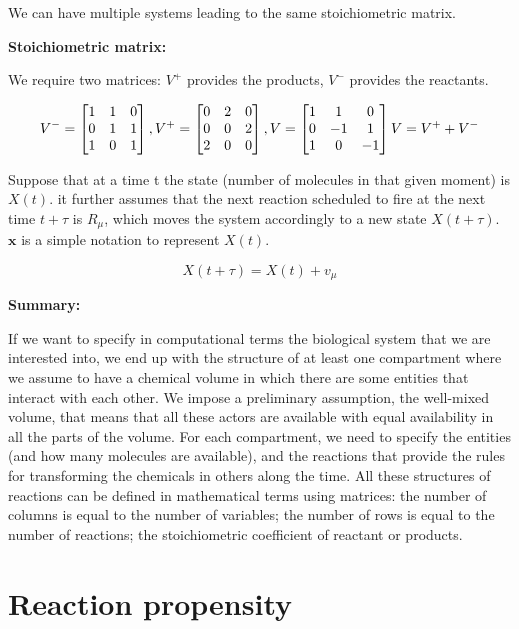 We can have multiple systems leading to the same stoichiometric matrix.

\textbf{Stoichiometric matrix:}

We require two matrices: $V^+$ provides the products, $V^-$ provides the
reactants.

$$
V^- = \begin{bmatrix} 1 & 1 & 0 \\ 0 & 1&1 \\ 1&0&1 \end{bmatrix}, V^+ = \begin{bmatrix} 0 & 2 & 0 \\ 0 & 0&2 \\ 2&0&0 \end{bmatrix} , V = \begin{bmatrix} 1 & 1 & 0 \\ 0 & -1&1 \\ 1&0&-1 \end{bmatrix} \\ V = V^+ + V^-
$$

Suppose that at a time t the state (number of molecules in that given
moment) is $X(t)$. it further assumes that the next reaction scheduled
to fire at the next time $t + \tau$ is $R _\mu$, which moves the system
accordingly to a new state $X(t + \tau)$. $\mathbf{x}$ is a simple
notation to represent $X(t)$.

$$
X(t+\tau) = X(t)+v_\mu
$$

\textbf{Summary:}

If we want to specify in computational terms the biological system that
we are interested into, we end up with the structure of at least one
compartment where we assume to have a chemical volume in which there are
some entities that interact with each other. We impose a preliminary
assumption, the well-mixed volume, that means that all these actors are
available with equal availability in all the parts of the volume. For
each compartment, we need to specify the entities (and how many
molecules are available), and the reactions that provide the rules for
transforming the chemicals in others along the time. All these
structures of reactions can be defined in mathematical terms using
matrices: the number of columns is equal to the number of variables; the
number of rows is equal to the number of reactions; the stoichiometric
coefficient of reactant or products.

\hypertarget{reaction-propensity}{%
\section{Reaction propensity}\label{reaction-propensity}}


